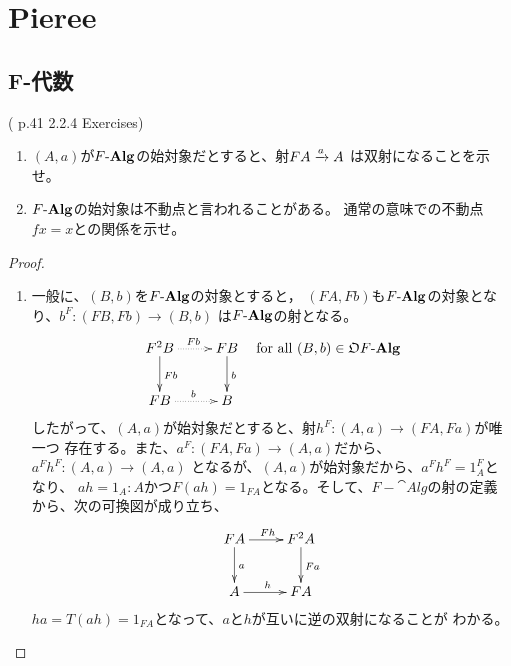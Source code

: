 {\setlength\arraycolsep{2pt}
%
\section{Pieree}\label{s1:Pieree} %
\subsection{F-代数}\label{s2:F-代数} %
	\begin{note}[問題2.2.4]\label{note:問題2.2.4} %
		(\cite{PIERCE91} p.41 2.2.4 Exercises)
		\begin{enumerate}\setlength{\itemsep}{-1mm} %
			\item $(A,a)$が$F\myhere\cat{Alg}$の始対象だとすると、射$FA\xrightarrow[{}]{a}A$
			は双射になることを示せ。
			\item $F\myhere\cat{Alg}$の始対象は不動点と言われることがある。
			通常の意味での不動点$fx=x$との関係を示せ。
		\end{enumerate} %
	\end{note} %
	\begin{proof} %
		\begin{enumerate}\setlength{\itemsep}{-1mm} %
			\item 一般に、$(B,b)$を$F\myhere\cat{Alg}$の対象とすると，
			$(FA,Fb)$も$F\myhere\cat{Alg}$の対象となり、$b^F:(FB,Fb)\to(B,b)$
			は$F\myhere\cat{Alg}$の射となる。
			\begin{equation*}\begin{split}
				\xymatrix{
					F^2B \ar@{.>}[r]^{Fb} \ar[d]^{Fb} & FB \ar[d]^b \\
					FB \ar@{.>}[r]^{b} & B \\
				} \quad\text{for all } (B,b)\in\obj F\myhere\cat{Alg}
			\end{split}\end{equation*}
			したがって、$(A,a)$が始対象だとすると、射$h^F:(A,a)\to(FA,Fa)$が唯一つ
			存在する。また、$a^F:(FA,Fa)\to(A,a)$だから、$a^Fh^F:(A,a)\to(A,a)$
			となるが、$(A,a)$が始対象だから、$a^Fh^F=1_{A}^F$となり、
			$ah=1_A:A$かつ$F(ah)=1_{FA}$となる。そして、$F-\cat{Alg}$の射の定義
			から、次の可換図が成り立ち、
			\begin{equation*}\begin{split}
				\xymatrix{
					FA \ar[r]^{Fh} \ar[d]^a & F^2A \ar[d]^{Fa} \\
					A \ar[r]^h & FA \\
				} 
			\end{split}\end{equation*}
			$ha=T(ah)=1_{FA}$となって、$a$と$h$が互いに逆の双射になることが
			わかる。
		\end{enumerate} %
	\end{proof} %
}
